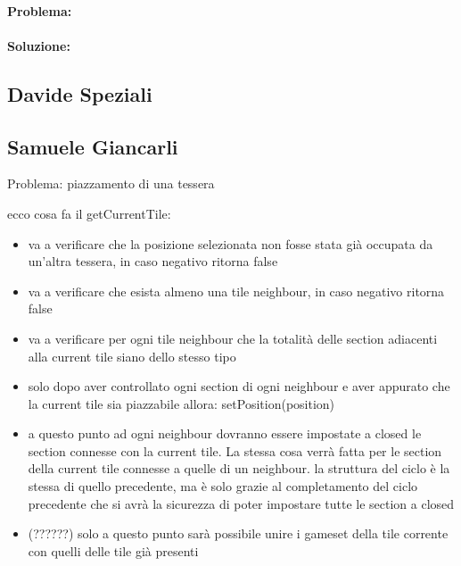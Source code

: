 \paragraph{Problema:}

\paragraph{Soluzione:}


\subsection*{Davide Speziali}

\subsection*{Samuele Giancarli}


Problema: piazzamento di una tessera



ecco cosa fa il getCurrentTile:

\begin{itemize}
\item va a verificare che la posizione selezionata non fosse stata già occupata da un’altra tessera, in caso negativo ritorna false
\item va a verificare che esista almeno una tile neighbour, in caso negativo ritorna false
\item va a verificare per ogni tile neighbour che la totalità delle section adiacenti alla current tile siano dello stesso tipo
\item solo dopo aver controllato ogni section di ogni neighbour e aver appurato che la current tile sia piazzabile allora: setPosition(position)
\item a questo punto ad ogni neighbour dovranno essere impostate a closed le section connesse con la current tile. La stessa cosa verrà fatta per le section della current tile connesse a quelle di un neighbour.
\subitem la struttura del ciclo è la stessa di quello precedente, ma è solo grazie al completamento del ciclo precedente che si avrà la sicurezza di poter impostare tutte le section a closed
\item (??????) solo a questo punto sarà possibile unire i gameset della tile corrente con quelli delle tile già presenti
\end{itemize}
